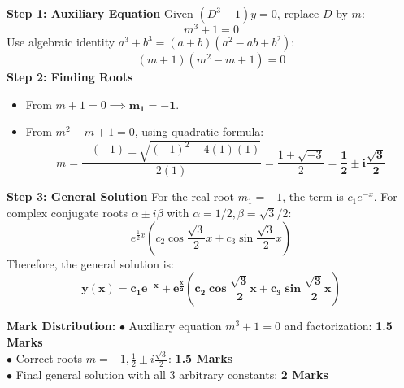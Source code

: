 \begin{solutionbox}
\textbf{Step 1: Auxiliary Equation}
Given $(D^3 + 1)y = 0$, replace $D$ by $m$:
\[
m^3 + 1 = 0
\]
Use algebraic identity $a^3 + b^3 = (a+b)(a^2 - ab + b^2)$:
\[
(m + 1)(m^2 - m + 1) = 0
\]
\textbf{Step 2: Finding Roots}
\begin{itemize}[leftmargin=6mm]
    \item From $m + 1 = 0 \implies \mathbf{m_1 = -1}$.
    \item From $m^2 - m + 1 = 0$, using quadratic formula:
    \[
    m = \frac{-(-1) \pm \sqrt{(-1)^2 - 4(1)(1)}}{2(1)} = \frac{1 \pm \sqrt{-3}}{2} = \mathbf{\frac{1}{2} \pm i\frac{\sqrt{3}}{2}}
    \]
\end{itemize}
\textbf{Step 3: General Solution}
For the real root $m_1 = -1$, the term is $c_1 e^{-x}$.
For complex conjugate roots $\alpha \pm i\beta$ with $\alpha = 1/2, \beta = \sqrt{3}/2$:
\[
e^{\frac{1}{2}x}\left(c_2 \cos\frac{\sqrt{3}}{2}x + c_3 \sin\frac{\sqrt{3}}{2}x\right)
\]
Therefore, the general solution is:
\[
\mathbf{y(x) = c_1 e^{-x} + e^{\frac{x}{2}}\left(c_2 \cos\frac{\sqrt{3}}{2}x + c_3 \sin\frac{\sqrt{3}}{2}x\right)}
\]

\begin{markingrubric}
\textbf{Mark Distribution:}
$\bullet$ Auxiliary equation $m^3 + 1 = 0$ and factorization: \textbf{1.5 Marks}\\
$\bullet$ Correct roots $m = -1, \frac{1}{2} \pm i\frac{\sqrt{3}}{2}$: \textbf{1.5 Marks}\\
$\bullet$ Final general solution with all 3 arbitrary constants: \textbf{2 Marks}
\end{markingrubric}
\end{solutionbox}

